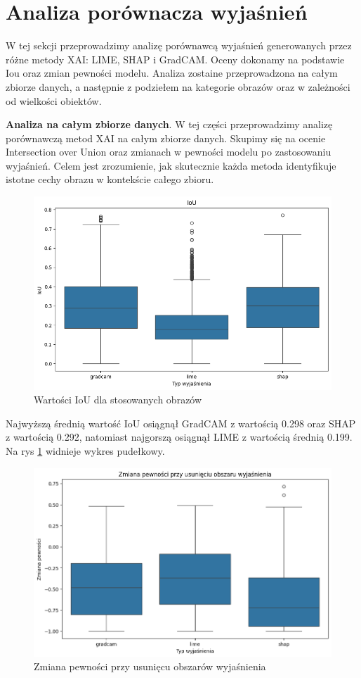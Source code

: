 \section*{Analiza porównacza wyjaśnień}
W tej sekcji przeprowadzimy analizę porównawcą wyjaśnień generowanych przez różne metody XAI: LIME, SHAP i GradCAM.
Oceny dokonamy na podstawie Iou oraz zmian pewności modelu.
Analiza zostaine przeprowadzona na całym zbiorze danych, a następnie z podziełem na kategorie obrazów oraz w zależności od wielkości obiektów.

\textbf{Analiza na całym zbiorze danych}.
W tej części przeprowadzimy analizę porównawczą metod XAI na całym zbiorze danych.
Skupimy się na ocenie Intersection over Union oraz zmianach w pewności modelu po zastosowaniu wyjaśnień. Celem jest zrozumienie, jak skutecznie każda metoda identyfikuje istotne cechy obrazu w kontekście całego zbioru.

\begin{figure}
	\centering\includegraphics[width=.6\textwidth]{img/base_iou}
	\caption{Wartości IoU  dla stosowanych obrazów}  \label{rys:basiciou}
\end{figure}
Najwyższą średnią wartość IoU osiągnął GradCAM z wartością 0.298 oraz SHAP z wartością 0.292, natomiast najgorszą osiągnął LIME z wartością średnią 0.199.
Na rys \ref{rys:basiciou} widnieje wykres pudełkowy.

\begin{figure}
	\centering\includegraphics[width=.6\textwidth]{img/base_confidence_mask}
	\caption{Zmiana pewności przy usunięcu obszarów wyjaśnienia}  \label{rys:base_confidence_mask}
\end{figure}

